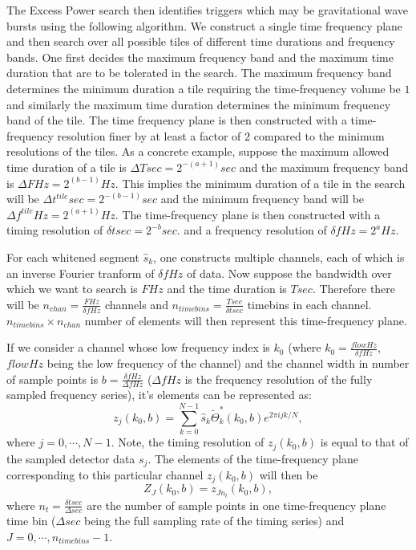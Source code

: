 The Excess Power search then identifies triggers which may be
gravitational wave bursts using the following algorithm.  
We construct a single
time frequency plane and then search over all possible tiles of different
time durations and frequency bands.  One first decides the maximum 
frequency band and the maximum time duration that are to be tolerated in
the search.  The maximum frequency band determines the minimum duration
a tile requiring the time-frequency volume be $1$ and 
similarly the maximum time duration determines the minimum frequency band
of the tile.  The time frequency plane is then constructed with a 
time-frequency resolution finer by at least a factor of $2$ compared to
the minimum resolutions of the tiles.  As a concrete example,  
suppose the maximum allowed time duration of  a tile is $\Delta T sec = 2^{-(a+1)} sec$  
and the maximum frequency band is 
$\Delta F Hz = 2^{(b-1)} Hz$.  This implies the minimum duration of a tile in the search will
be  $\Delta t^{tile} sec = 2^{-(b-1)} sec$  and the minimum frequency band will be  
$\Delta f^{tile} Hz = 2^{(a+1)} Hz$.
 The time-frequency plane is then constructed with a timing resolution
of $\delta t sec = 2^{-b} sec.$ and a frequency resolution of $\delta f Hz = 2^a Hz$.


For each whitened segment
$\hat{s}_k$, one constructs multiple channels,  each of which is an
inverse Fourier tranform of $\delta f Hz$ of data.  Now suppose the bandwidth over which we 
want to search is $ F Hz$ and the time duration is $ T sec $.
Therefore there will be
$n_{chan} = \frac{ F Hz}{\delta f Hz}$ channels and $n_{timebins} = \frac{T sec}{ \delta t sec}$
timebins in each channel. $n_{timebins} \times n_{chan}$ number of elements 
will then represent this time-frequency plane.

If we consider a channel whose low frequency index is $k_0$ 
(where $k_0 = \frac{flow Hz}{ \delta f Hz}$,  $flow Hz$ being the low frequency of the channel) 
and the channel width in number of sample points is $ b = \frac{\delta f Hz }{\Delta f Hz} $
($\Delta f Hz $ is the frequency resolution of the fully sampled frequency series),   
it's elements can be represented as:
\begin{equation}
z_{j}(k_0,  b) = \sum_{k=0}^{N-1}  \hat{s}_k \tilde{\Theta}_k^\ast(k_0,  b) e^{2 \pi ijk/N},
\end{equation}  where $j = 0,\cdots, N-1$.  Note,  the timing
resolution of $z_j(k_0,  b)$ is equal to that of the sampled detector data $s_j$.
 The elements of the time-frequency plane corresponding to this 
particular channel $z_j(k_0,  b)$ will then be 
\begin{equation}
Z_J(k_0,  b)   = z_{Jn_t}(k_0,  b),
\end{equation} where $n_t = \frac{\delta t sec}{\Delta sec}$ are the number of sample
points in one time-frequency plane time bin ($\Delta sec$ being the full sampling
rate of the timing series)  and $J = 0, \cdots, n_{timebins} - 1$.

